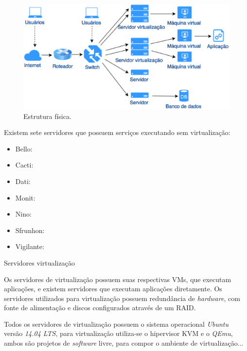 \begin{figure}[h!]
 \centering
 \includegraphics[width=430px]{img/servfisicos.eps}
 \caption{Estrutura física.}
 \label{fig:servfisicos}
\end{figure}

Existem sete servidores que possuem serviços executando sem virtualização:
\begin{itemize}
 \item Bello: 
 \item Cacti: 
 \item Dati: 
 \item Monit: 
 \item Nino: 
 \item Sfrunhon: 
 \item Vigilante: 
\end{itemize}

Servidores virtualização

Os servidores de virtualização possuem suas 
respectivas \ac{VM}s, que executam aplicações, e existem servidores que executam aplicações diretamente.
Os servidores utilizados para virtualização possuem redundância de \textit{hardware}, com fonte de alimentação e discos configurados através 
de um \ac{RAID}.

Todos os servidores de virtualização possuem o sistema operacional \textit{Ubuntu} versão \textit{14.04 LTS}, para virtualização utiliza-se o 
hipervisor \ac{KVM} e o \textit{QEmu}, ambos são projetos de \textit{software} livre, para compor o ambiente de virtualização...


